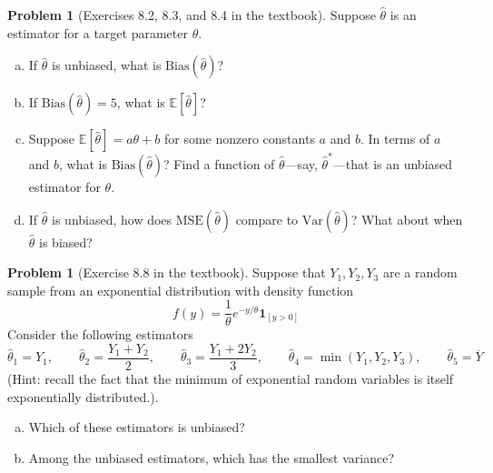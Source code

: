\documentclass[10pt]{article}
\theoremstyle{definition}
\newtheorem{problem}[theorem]{Problem}
\newcommand{\1}[1]{\textbf{1}_{\left[#1\right]}} %
\def\E{\mathbb{E}} %
\begin{document}
\begin{problem}[Exercises 8.2, 8.3, and 8.4 in the textbook]
  Suppose $\widehat{\theta}$ is an estimator for a target parameter $\theta$.
  \begin{enumerate}[(a)]
    \item If $\widehat{\theta}$ is unbiased, what is $\text{Bias}(\widehat{\theta})$?
    \item If $\text{Bias}(\widehat{\theta})=5$, what is $\E[\widehat{\theta} ]$?
    \item Suppose $\E[\widehat{\theta} ]=a\theta+b$ for some
    nonzero constants $a$ and $b$. In terms of $a$ and $b$, what is
    $\text{Bias}(\widehat{\theta})$? Find a function of
    $\widehat{\theta}$---say, $\widehat{\theta}^{*}$---that is an unbiased
    estimator for $\theta$.
    \item If $\widehat{\theta}$ is unbiased, how does
    $\text{MSE}(\widehat{\theta})$ compare to $\text{Var}(\widehat{\theta})$?
    What about when $\widehat{\theta}$ is biased?
  \end{enumerate}
\end{problem}

\begin{problem}[Exercise 8.8 in the textbook]
  Suppose that $Y_{1},Y_{2},Y_{3}$ are a random sample from an exponential
  distribution with density function
  \begin{equation*}
    f(y) = \frac{1}{\theta}e^{-y/\theta}\mathbf{1}_{\left[ y>0 \right] }
  \end{equation*}
  Consider the following estimators
  \begin{equation*}
    \widehat{\theta}_{1} =Y_{1}, \quad\quad \widehat{\theta}_{2}= \frac{Y_{1}+Y_{2}}{2}, \quad\quad \widehat{\theta}_{3} = \frac{Y_{1}+2Y_{2}}{3}, \quad\quad \widehat{\theta}_{4} = \min(Y_{1},Y_{2},Y_{3}), \quad\quad \widehat{\theta}_{5}= \overline{Y}
  \end{equation*}
  (Hint: recall the fact that the minimum of exponential random variables is
  itself exponentially distributed.).
  \begin{enumerate}[(a)]
    \item Which of these estimators is unbiased? 
    \item Among the unbiased estimators, which has the smallest variance?
  \end{enumerate}
\end{problem}
\end{document}
